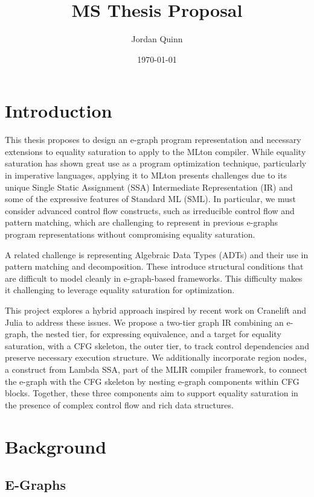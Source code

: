 \documentclass{article}
\title{MS Thesis Proposal}
\author{Jordan Quinn}
\date{\today}
\begin{document}
\maketitle


\section{Introduction}

This thesis proposes to design an e-graph program representation and necessary extensions to equality saturation to apply to the MLton compiler. While equality saturation has shown great use as a program optimization technique, particularly in imperative languages, applying it to MLton presents challenges due to its unique Single Static Assignment (SSA) Intermediate Representation (IR) and some of the expressive features of Standard ML (SML). In particular, we must consider advanced control flow constructs, such as irreducible control flow and pattern matching, which are challenging to represent in previous e-graphs program representations without compromising equality saturation.

A related challenge is representing Algebraic Data Types (ADTs) and their use in pattern matching and decomposition. These introduce structural conditions that are difficult to model cleanly in e-graph-based frameworks. This difficulty makes it challenging to leverage equality saturation for optimization.

This project explores a hybrid approach inspired by recent work on Cranelift and Julia to address these issues. We propose a two-tier graph IR combining an e-graph, the nested tier, for expressing equivalence, and a target for equality saturation,  with a CFG skeleton, the outer tier, to track control dependencies and preserve necessary execution structure. We additionally incorporate region nodes, a construct from Lambda SSA, part of the MLIR compiler framework, to connect the e-graph with the CFG skeleton by nesting e-graph components within CFG blocks. Together, these three components aim to support equality saturation in the presence of complex control flow and rich data structures.



\section{Background}

\subsection{E-Graphs}
\end{document}
